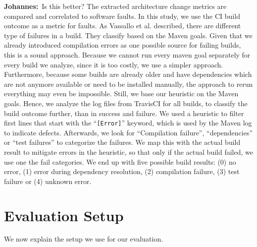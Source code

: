 \documentclass[sigplan, anonymous, review]{acmart}
\newcommand{\jk}[1]{{\color{violet}\textbf{Johannes:}~#1}}
\begin{document}
\jk{Is this better?}
The extracted architecture change metrics are compared and correlated to software faults. In this study, we use the CI build outcome as a metric for faults. 
As Vassallo et al. \cite{CIFailTypes} described, there are different type of failures in a build. They classify based on the Maven goals. Given that we already introduced compilation errors as one possible source for failing builds, this is a sound approach. Because we cannot run every maven goal separately for every build we analyze, since it is too costly, we use a simpler approach. 
Furthermore, because some builds are already older and have dependencies which are not anymore available or need to be installed manually, the approach to rerun everything may even be impossible. Still, we base our heuristic on the Maven goals.
Hence, we analyze the log files from TravisCI for all builds, to classify the build outcome further, than in success and failure. We used a heuristic to filter first lines that start with the ``\texttt{[Error]}'' keyword, which is used by the Maven log to indicate defects. Afterwards, we look for ``Compilation failure'', ``dependencies'' or ``test failures'' to categorize the failures. We map this with the actual build result to mitigate errors in the heuristic, so that only if the actual build failed, we use one the fail categories. We end up with five possible build results: (0) no error, (1) error during dependency resolution, (2) compilation failure, (3) test failure or (4) unknown error. 

\section{Evaluation Setup}

We now explain the setup we use for our evaluation.
\end{document}

